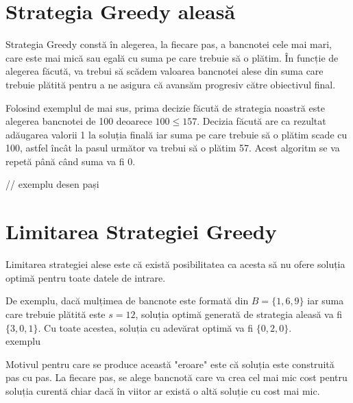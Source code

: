 \section{Strategia Greedy aleasă}

Strategia Greedy constă în alegerea, la fiecare pas, a bancnotei cele mai mari, care este mai mică sau egală cu suma pe care trebuie să o plătim. În funcție de alegerea făcută, va trebui să scădem valoarea bancnotei alese din suma care trebuie plătită pentru a ne asigura că avansăm progresiv către obiectivul final.
\par
Folosind exemplul de mai sus, prima decizie făcută de strategia noastră este alegerea bancnotei de 100 deoarece $ 100 	\leq 157$.  Decizia făcută are ca rezultat adăugarea valorii 1 la soluția finală iar suma pe care trebuie să o plătim scade cu 100, astfel încât la pasul următor va trebui să o plătim 57. Acest algoritm se va repetă până când suma va fi 0.



// exemplu desen pași 

\section{Limitarea Strategiei Greedy}
Limitarea strategiei alese este că există posibilitatea ca acesta să nu ofere soluția optimă pentru toate datele de intrare.\par
De exemplu, dacă mulțimea de bancnote este formată din $B = \{ 1,6,9 \}$ iar suma care trebuie plătită este $s = 12$, soluția optimă generată de strategia aleasă va fi $\{3,0,1\}$. Cu toate acestea, soluția cu adevărat optimă va fi $\{0,2,0\}$. 
\\exemplu

Motivul pentru care se produce această "eroare" este că soluția este construită pas cu pas. La fiecare pas, se alege bancnotă care va crea cel mai mic cost pentru soluția curentă chiar dacă în viitor ar există o altă soluție cu cost mai mic.
